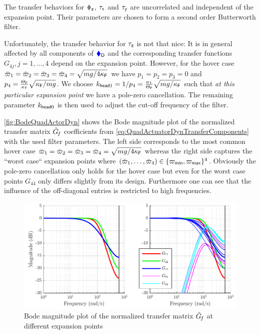 The transfer behaviors for $\Fz$, $\taux$ and $\tauy$ are uncorrelated and independent of the expansion point.
Their parameters are chosen to form a second order Butterworth filter.

Unfortunately, the transfer behavior for $\tauz$ is not that nice:
It is in general affected by all components of $\genForceD$ and the corresponding transfer functions $G_{4j}, j=1,\ldots,4$ depend on the expansion point.
However, for the hover case $\PropVelStat[1] = \PropVelStat[2] = \PropVelStat[3] = \PropVelStat[4] = \sqrt{\sfrac{m \gravityAccConst}{4\kappaF}}$ we have $p_1=p_2=p_3=0$ and $p_4 = \tfrac{\PropInertia}{\kappaT}\sqrt{\sfrac{\kappaF}{m \gravityAccConst}}$.
We choose $\kDHead = \sfrac{1}{p_4} = \tfrac{\kappaT}{\PropInertia}\sqrt{\sfrac{m \gravityAccConst}{\kappaF}}$ such that \textit{at this particular expansion point} we have a pole-zero cancellation.
The remaining parameter $\kPHead$ is then used to adjust the cut-off frequency of the filter.

\autoref{fig:BodeQuadActorDyn} shows the Bode magnitude plot of the normalized transfer matrix $\GenForceTransferFunctionNorm$ coefficients from \eqref{eq:QuadActuatorDynTransferComponents} with the used filter parameters.
The left side corresponds to the most common hover case $\PropVelStat[1] = \PropVelStat[2] = \PropVelStat[3] = \PropVelStat[4] = \sqrt{\sfrac{m \gravityAccConst}{4\kappaF}}$ whereas the right side captures the ``worst case`` expansion points where $(\PropVelStat[1], \ldots,\PropVelStat[4]) \in \{ \PropVelMin, \PropVelMax\}^4$.
Obviously the pole-zero cancellation only holds for the hover case but even for the worst case points $G_{44}$ only differs slightly from its design.
Furthermore one can see that the influence of the off-diagonal entries is restricted to high frequencies.

\begin{figure}[ht]
 \centering
 \includegraphics{graphics/QuadActuatorDynamics/BodeQuadActorDyn.pdf}
 \caption{Bode magnitude plot of the normalized transfer matrix $\GenForceTransferFunctionNorm$ at different expansion points}
 \label{fig:BodeQuadActorDyn}
\end{figure}

